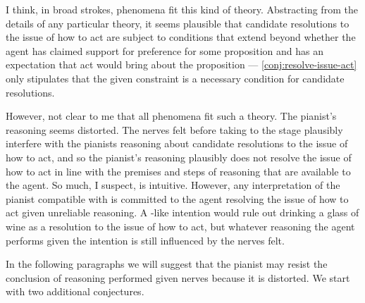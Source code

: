 \begin{note}[Broader]
  I think, in broad strokes, phenomena fit this kind of theory.
  Abstracting from the details of any particular theory, it seems plausible that candidate resolutions to the issue of how to act are subject to conditions that extend beyond whether the agent has claimed support for preference for some proposition and has an expectation that act would bring about the proposition --- \autoref{conj:resolve-issue-act} only stipulates that the given constraint is a necessary condition for candidate resolutions.

  However, not clear to me that all phenomena fit such a theory.
  The pianist's reasoning seems distorted.
  The nerves felt before taking to the stage plausibly interfere with the pianists reasoning about candidate resolutions to the issue of how to act, and so the pianist's reasoning plausibly does not resolve the issue of how to act in line with the premises and steps of reasoning that are available to the agent.
  So much, I suspect, is intuitive.
  However, any interpretation of the pianist compatible with \ESU{} is committed to the agent resolving the issue of how to act given unreliable reasoning.
  A \citeauthor{Bratman:1987aa}-like intention would rule out drinking a glass of wine as a resolution to the issue of how to act, but whatever reasoning the agent performs given the intention is still influenced by the nerves felt.

  In the following paragraphs we will suggest that the pianist may resist the conclusion of reasoning performed given nerves because it is distorted.
  We start with two additional conjectures.
\end{note}

